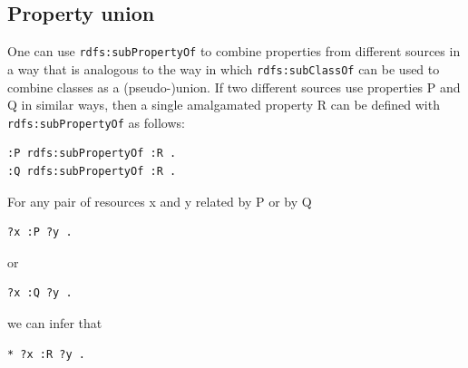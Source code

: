 \subsection{Property union}
\label{punion}
One can use \texttt{rdfs:subPropertyOf} to combine properties from different
sources in a way that is analogous to the way in which \texttt{rdfs:subClassOf}
can be used to combine classes as a (pseudo-)union. If two different sources use
properties P and Q in similar ways, then a single amalgamated property R
can be defined with \texttt{rdfs:subPropertyOf} as follows:

\begin{lstlisting}
:P rdfs:subPropertyOf :R .
:Q rdfs:subPropertyOf :R .
\end{lstlisting}

For any pair of resources x and y related by P or by Q

\begin{lstlisting}
?x :P ?y .
\end{lstlisting}

or

\begin{lstlisting}
?x :Q ?y .
\end{lstlisting}

we can infer that

\begin{lstlisting}
* ?x :R ?y .
\end{lstlisting}


